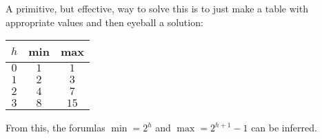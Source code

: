 A primitive, but effective, way to solve this is to just make a table with appropriate values and then eyeball a solution:
\begin{center}
\begin{tabular}{c c c}
	$h$ & min & max \\ \hline
	$0$ & $1$ & $1$ \\
	$1$ & $2$ & $3$ \\
	$2$ & $4$ & $7$ \\
	$3$ & $8$ & $15$ \\
\end{tabular}
\end{center}
From this, the forumlas $\min = 2^h$ and $\max = 2^{h+1} - 1$ can be inferred.
